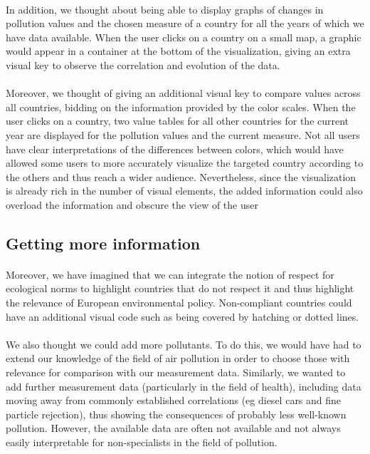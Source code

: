 \documentclass[preprint,journal]{vgtc}       %
\begin{document}
\paragraph{}
In addition, we thought about being able to display graphs of changes in pollution values ​​and the chosen measure of a country for all the years of which we have data available. When the user clicks on a country on a small map, a graphic would appear in a container at the bottom of the visualization, giving an extra visual key to observe the correlation and evolution of the data. 

\paragraph{}
Moreover, we thought of giving an additional visual key to compare values ​​across all countries, bidding on the information provided by the color scales. When the user clicks on a country, two value tables for all other countries for the current year are displayed for the pollution values ​​and the current measure. Not all users have clear interpretations of the differences between colors, which would have allowed some users to more accurately visualize the targeted country according to the others and thus reach a wider audience. Nevertheless, since the visualization is already rich in the number of visual elements, the added information could also overload the information and obscure the view of the user


\subsection{Getting more information}

\paragraph{}
Moreover, we have imagined that we can integrate the notion of respect for ecological norms to highlight countries that do not respect it and thus highlight the relevance of European environmental policy. Non-compliant countries could have an additional visual code such as being covered by hatching or dotted lines.

\paragraph{}
We also thought we could add more pollutants. To do this, we would have had to extend our knowledge of the field of air pollution in order to choose those with relevance for comparison with our measurement data. Similarly, we wanted to add further measurement data (particularly in the field of health), including data moving away from commonly established correlations (eg diesel cars and fine particle rejection), thus showing the consequences of probably less well-known pollution. However, the available data are often not available and not always easily interpretable for non-specialists in the field of pollution.
		
\end{document}
